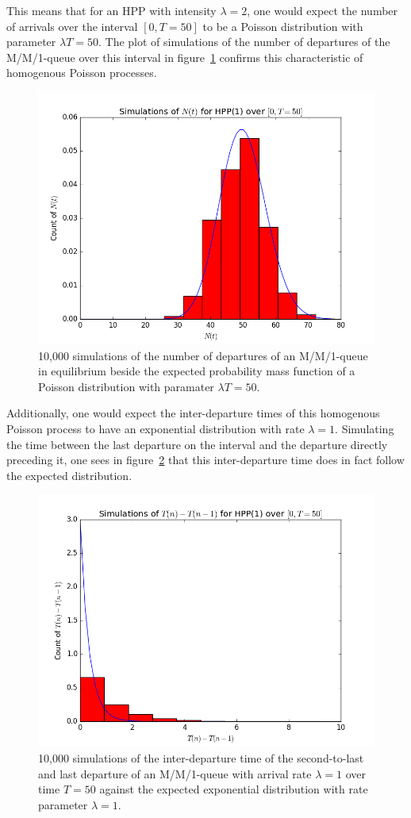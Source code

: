 \documentclass[11pt, oneside]{article}
\begin{document}
This means that for an HPP with intensity $\lambda=2$, one would expect the number of arrivals over the interval $[0,T=50]$ to be a Poisson distribution with parameter $\lambda T=50$. The plot of simulations of the number of departures of the M/M/1-queue over this interval in figure~\ref{fig:depart_count} confirms this characteristic of homogenous Poisson processes.
\begin{figure}[H]
\includegraphics[scale=0.55]{nt_hpp}
\caption{10,000 simulations of the number of departures of an M/M/1-queue in equilibrium beside the expected probability mass function of a Poisson distribution with paramater $\lambda T=50$.}
\label{fig:depart_count}
\end{figure}
Additionally, one would expect the inter-departure times of this homogenous Poisson process to have an exponential distribution with rate $\lambda = 1$. Simulating the time between the last departure on the interval and the departure directly preceding it, one sees in figure~\ref{fig:inter_departure} that this inter-departure time does in fact follow the expected distribution.
\begin{figure}[H]
\includegraphics[scale=0.55]{tn_tn1}
\caption{10,000 simulations of the inter-departure time of the second-to-last and last departure of an M/M/1-queue with arrival rate $\lambda = 1$ over time $T=50$ against the expected exponential distribution with rate parameter $\lambda = 1$.}
\label{fig:inter_departure}
\end{figure}
\end{document}
